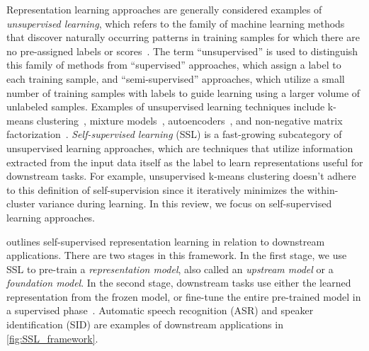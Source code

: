 Representation learning approaches are generally considered examples of \textit{unsupervised
learning}, which refers to the family of machine learning methods that discover
naturally occurring patterns in training samples for which there are no pre-assigned
labels or scores~\cite{jordan_2015}. 
The term ``unsupervised'' is used to distinguish this family of methods from
``supervised'' approaches, which assign a label to each training sample, and
``semi-supervised'' approaches, which utilize a small number of training samples
with labels to guide learning using a larger volume of unlabeled samples.
Examples of unsupervised learning techniques include k-means clustering~\cite{vq}, mixture models~\cite{MoE}, autoencoders~\cite{hinton_94},
and non-negative matrix factorization~\cite{nmf}. 
\textit{Self-supervised learning} (SSL) is a fast-growing subcategory of
unsupervised learning approaches, which are techniques that utilize
information extracted from the input data itself as the label to learn
representations useful for 
downstream tasks. {\color{black} For example, unsupervised k-means clustering doesn't adhere to this definition of self-supervision since it iteratively minimizes the within-cluster variance during learning.}
In this review, we
focus on self-supervised learning approaches.

 outlines self-supervised representation learning in
relation to downstream applications. 
There are two stages in this framework.
In the first stage, we use SSL to pre-train a \textit{representation model},
also called an \textit{upstream model} or a \textit{foundation model}.
In the second stage, downstream tasks use either the learned
representation from the frozen model, or fine-tune the entire pre-trained model
in a supervised phase~\cite{hinton_2006}. 
Automatic speech recognition (ASR) and speaker identification (SID) are 
examples of downstream applications in \cref{fig:SSL_framework}.




